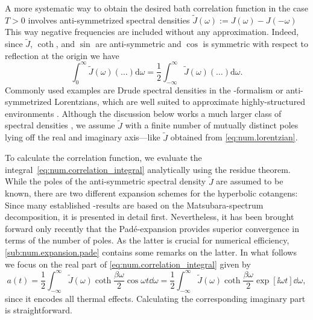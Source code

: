 A more systematic way to obtain the desired bath correlation function in the case $T > 0$ involves anti-symmetrized spectral densities $\tilde J(\omega) := J(\omega) - J(-\omega)$
This way negative frequencies are included without any approximation.
Indeed, since $\tilde J$, $\coth$, and $\sin$ are anti-symmetric and $\cos$ is symmetric with respect to reflection at the origin we have
\begin{equation}
  \int_0^\infty \tilde J(\omega) (\dots) \mathrm{d}\omega = \frac{1}{2}\int_{-\infty}^\infty \tilde J(\omega) (\dots) \mathrm{d}\omega.
  \label{eq:num.correlation_integral}
\end{equation}
Commonly used examples are Drude spectral densities in the \HEOM-formalism \cite{} or anti-symmetrized Lorentzians, which are well suited to approximate highly-structured environments \cite{MeTa99_non_markovian}.
Although the discussion below works a much larger class of spectral densities \cite{RiEi13_bcf}, we assume $\tilde J$ with a finite number of mutually distinct poles lying off the real and imaginary axis---like $\tilde J$ obtained from \autoref{eq:num.lorentzian}.

To calculate the correlation function, we evaluate the integral~\ref{eq:num.correlation_integral} analytically using the residue theorem.
While the poles of the anti-symmetric spectral density $\tilde J$ are assumed to be known, there are two different expansion schemes for the hyperbolic cotangens:
Since many established \HEOM-results are based on the Matsubara-spectrum decomposition, it is presented in detail first.
Nevertheless, it has been brought forward only recently that the Padé-expansion provides superior convergence in terms of the number of poles.
As the latter is crucial for numerical efficiency, \autoref{sub:num.expansion.pade} contains some remarks on the latter.
In what follows we focus on the real part of \autoref{eq:num.correlation_integral} given by
\begin{equation}
  a(t) = \frac{1}{2} \int_{-\infty}^\infty \tilde J(\omega) \coth \frac{\beta\omega}{2} \cos \omega t \dd\omega
  = \frac{1}{2} \int_{-\infty}^\infty \tilde J(\omega) \coth \frac{\beta\omega}{2} \exp[\ii \omega t] \dd\omega,
  \label{eq:num.alpha_thermal_re}
\end{equation}
since it encodes all thermal effects.
Calculating the corresponding imaginary part is straightforward.


